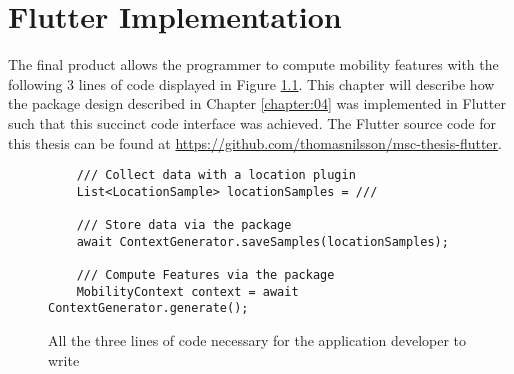 \chapter{Flutter Implementation}
\label{chapter:05}
The final product allows the programmer to compute mobility features with the following 3 lines of code displayed in Figure \ref{fig:code-example-intro}. This chapter will describe how the package design described in Chapter \ref{chapter:04} was implemented in Flutter such that this succinct code interface was achieved.  The Flutter source code for this thesis can be found at \url{https://github.com/thomasnilsson/msc-thesis-flutter}.

\begin{figure}[h]
    \centering
    \begin{verbatim}
    /// Collect data with a location plugin
    List<LocationSample> locationSamples = ///

    /// Store data via the package
    await ContextGenerator.saveSamples(locationSamples);
    
    /// Compute Features via the package
    MobilityContext context = await ContextGenerator.generate();
    \end{verbatim}
    \caption{All the three lines of code necessary for the application developer to write}
    \label{fig:code-example-intro}
\end{figure}










